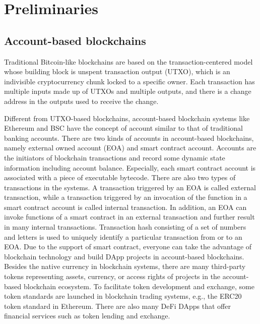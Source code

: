 \section{Preliminaries} 
\label{sec:preliminaries}

\subsection{Account-based blockchains}
Traditional Bitcoin-like blockchains are based on the transaction-centered model \cite{wu2021analysis} whose building block is unspent transaction output (UTXO), which is an indivisible cryptocurrency chunk locked to a specific owner. Each transaction has multiple inputs made up of UTXOs and multiple outputs, and there is a change address in the outputs used to receive the change.

Different from UTXO-based blockchains, account-based blockchain systems like Ethereum and BSC have the concept of account similar to that of traditional banking accounts. 
There are two kinds of accounts in account-based blockchains, namely external owned account (EOA) and smart contract account. 
Accounts are the initiators of blockchain transactions and record some dynamic state information including account balance. 
Especially, each smart contract account is associated with a piece of executable bytecode. There are also two types of transactions in the systems. 
A transaction triggered by an EOA is called external transaction, while a transaction triggered by an invocation of the function in a smart contract account is called internal transaction. 
In addition, an EOA can invoke functions of a smart contract in an external transaction and further result in many internal transactions. Transaction hash consisting of a set of numbers and letters is used to uniquely identify a particular transaction from or to an EOA.
Due to the support of smart contract, everyone can take the advantage of blockchain technology and build DApp projects in account-based blockchains.
Besides the native currency in blockchain systems, there are many third-party tokens representing assets, currency, or access rights of projects in the account-based blockchain ecosystem. 
To facilitate token development and exchange, some token standards are launched in blockchain trading systems, e.g., the ERC20 token standard in Ethereum. 
There are also many DeFi DApps that offer financial services such as token lending and exchange.

